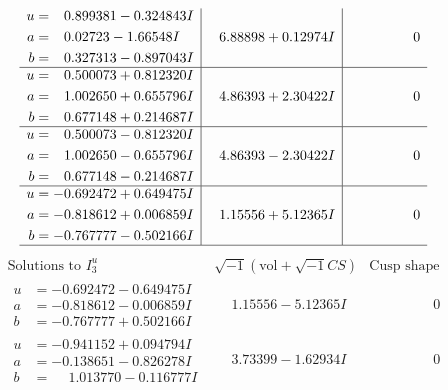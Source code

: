 \documentclass[1p]{elsarticle_modified}
\theoremstyle{definition}
\newcommand{\I}{\sqrt{-1}}
\begin{document}
$$\begin{array}{c|c|c}
\begin{aligned}
u &= \phantom{-}0.899381 - 0.324843 I \\
a &= \phantom{-}0.02723 - 1.66548 I \\
b &= \phantom{-}0.327313 - 0.897043 I\end{aligned}
 & \phantom{-}6.88898 + 0.12974 I & \phantom{-0.000000 } 0 \\ \hline\begin{aligned}
u &= \phantom{-}0.500073 + 0.812320 I \\
a &= \phantom{-}1.002650 + 0.655796 I \\
b &= \phantom{-}0.677148 + 0.214687 I\end{aligned}
 & \phantom{-}4.86393 + 2.30422 I & \phantom{-0.000000 } 0 \\ \hline\begin{aligned}
u &= \phantom{-}0.500073 - 0.812320 I \\
a &= \phantom{-}1.002650 - 0.655796 I \\
b &= \phantom{-}0.677148 - 0.214687 I\end{aligned}
 & \phantom{-}4.86393 - 2.30422 I & \phantom{-0.000000 } 0 \\ \hline\begin{aligned}
u &= -0.692472 + 0.649475 I \\
a &= -0.818612 + 0.006859 I \\
b &= -0.767777 - 0.502166 I\end{aligned}
 & \phantom{-}1.15556 + 5.12365 I & \phantom{-0.000000 } 0\\
 \hline 
 \end{array}$$\newpage$$\begin{array}{c|c|c}  
\text{Solutions to }I^u_{3}& \I (\text{vol} + \sqrt{-1}CS) & \text{Cusp shape}\\
 \hline 
\begin{aligned}
u &= -0.692472 - 0.649475 I \\
a &= -0.818612 - 0.006859 I \\
b &= -0.767777 + 0.502166 I\end{aligned}
 & \phantom{-}1.15556 - 5.12365 I & \phantom{-0.000000 } 0 \\ \hline\begin{aligned}
u &= -0.941152 + 0.094794 I \\
a &= -0.138651 - 0.826278 I \\
b &= \phantom{-}1.013770 - 0.116777 I\end{aligned}
 & \phantom{-}3.73399 - 1.62934 I & \phantom{-0.000000 } 0 \\ \hline\begin{aligned}

\end{aligned}
\end{array}$$
\end{document}
